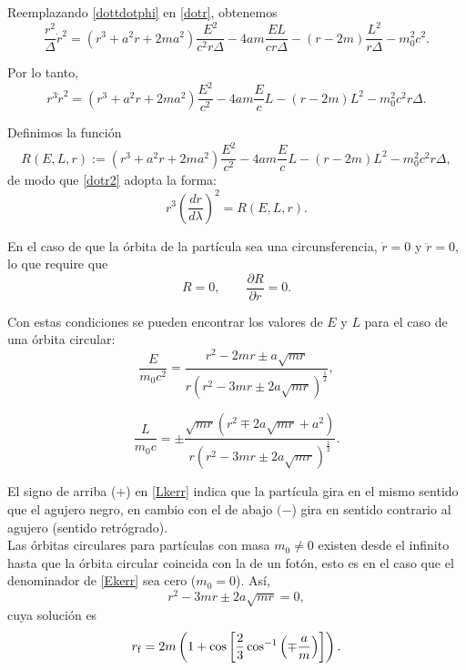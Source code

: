 Reemplazando \eqref{dottdotphi} en \eqref{dotr}, obtenemos
\begin{equation}
\frac{r^2}{\Delta}\dot{r}^2=\left( r^3+a^2r+2ma^2\right)\frac{E^2}{c^2r\Delta}-4am\frac{EL}{cr\Delta}-\left(r-2m\right)\frac{L^2}{r\Delta}-m_0^2c^2.
\end{equation}

Por lo tanto,
\begin{equation}\label{dotr2}
r^3\dot{r}^2=\left( r^3+a^2r+2ma^2\right)\frac{E^2}{c^2}-4am\frac{E}{c}L-\left(r-2m\right)L^2-m_0^2c^2r\Delta .
\end{equation}

Definimos la funci\'on
\begin{equation}\label{R}
R(E,L,r):=\left( r^3+a^2r+2ma^2\right)\frac{E^2}{c^2}-4am\frac{E}{c}L-\left(r-2m\right)L^2-m_0^2c^2r\Delta,
\end{equation}
de modo que \eqref{dotr2} adopta la forma:
\begin{equation}
r^3\left(\frac{dr}{d\lambda}\right)^2=R(E,L,r).
\end{equation}

En el caso de que la \'orbita de la part\'icula sea una circunsferencia, $\dot{r}=0$ y $\ddot{r}=0$, lo que require que 
\begin{equation}
R=0, \qquad \frac{\partial R}{\partial r}=0.
\end{equation}

Con estas condiciones se pueden encontrar los valores de $E$ y $L$ para el caso de una \'orbita circular:
\begin{equation}
\frac{E}{m_0c^2}=\frac{r^2-2mr\pm a\sqrt{mr}}{r\left(r^2-3mr\pm 2a\sqrt{mr}\right)^{\frac{1}{2}}} , \label{Ekerr}
\end{equation}

\begin{equation}
\frac{L}{m_0c}=\pm\frac{\sqrt{mr}\left(r^2\mp 2a\sqrt{mr}+a^2 \right)}{r\left(r^2-3mr\pm 2a\sqrt{mr}\right)^{\frac{1}{2}}} .\label{Lkerr} 
\end{equation}

El signo de arriba ($+$) en \eqref{Lkerr} indica que la part\'icula gira en el mismo sentido que el agujero negro, en cambio con el de abajo $(-$) gira en sentido contrario al agujero (sentido retr\'ogrado).\\

Las \'orbitas circulares para part\'iculas con masa $m_0\neq 0$ existen desde el infinito hasta que la \'orbita circular coincida con la de un fot\'on, esto es en el caso que el denominador de \eqref{Ekerr} sea cero ($m_0=0$). As\'i,
\begin{equation}
r^2-3mr\pm 2a\sqrt{mr}=0,
\end{equation}
cuya soluci\'on es
\begin{equation}\label{phorbit}
r_{\rm f}=2m\left(1+\cos\left[\frac{2}{3}\cos^{-1}\left(\mp \frac{a}{m} \right) \right] \right).
\end{equation}


